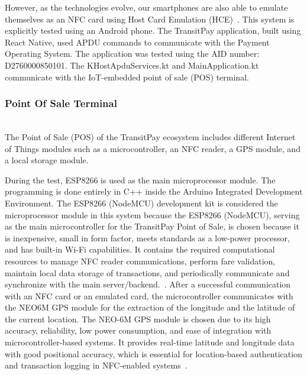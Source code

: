 \documentclass[sigconf, nonacm]{acmart}
\begin{document}

However, as the technologies evolve, our smartphones are also able to emulate themselves as an NFC card using Host Card Emulation (HCE)~\cite{hceoverview}. This system is explicitly tested using an Android phone. The TransitPay application, built using React Native, used APDU commands to communicate with the Payment Operating System. The application was tested using the AID number: D2760000850101. The KHostApduServices.kt and MainApplication.kt communicate with the IoT-embedded point of sale (POS) terminal.


\subsubsection{Point Of Sale Terminal} \mbox{} \\

The Point of Sale (POS) of the TransitPay ecosystem includes different Internet of Things modules such as a microcontroller, an NFC reader, a GPS module, and a local storage module.

During the test, ESP8266 is used as the main microprocessor module. The programming is done entirely in C++ inside the Arduino Integrated Development Environment. The ESP8266 (NodeMCU) development kit is considered the microprocessor module in this system because the ESP8266 (NodeMCU), serving as the main microcontroller for the TransitPay Point of Sale, is chosen because it is inexpensive, small in form factor, meets standards as a low-power processor, and has built-in Wi-Fi capabilities. It contains the required computational resources to manage NFC reader communications, perform fare validation, maintain local data storage of transactions, and periodically communicate and synchronize with the main server/backend.~\cite{esp8266soc}.
After a successful communication with an NFC card or an emulated card, the microcontroller communicates with the NEO6M GPS module for the extraction of the longitude and the latitude of the current location. The NEO-6M GPS module is chosen due to its high accuracy, reliability, low power consumption, and ease of integration with microcontroller-based systems. It provides real-time latitude and longitude data with good positional accuracy, which is essential for location-based authentication and transaction logging in NFC-enabled systems~\cite{gpsneo6m}. 
\end{document}
